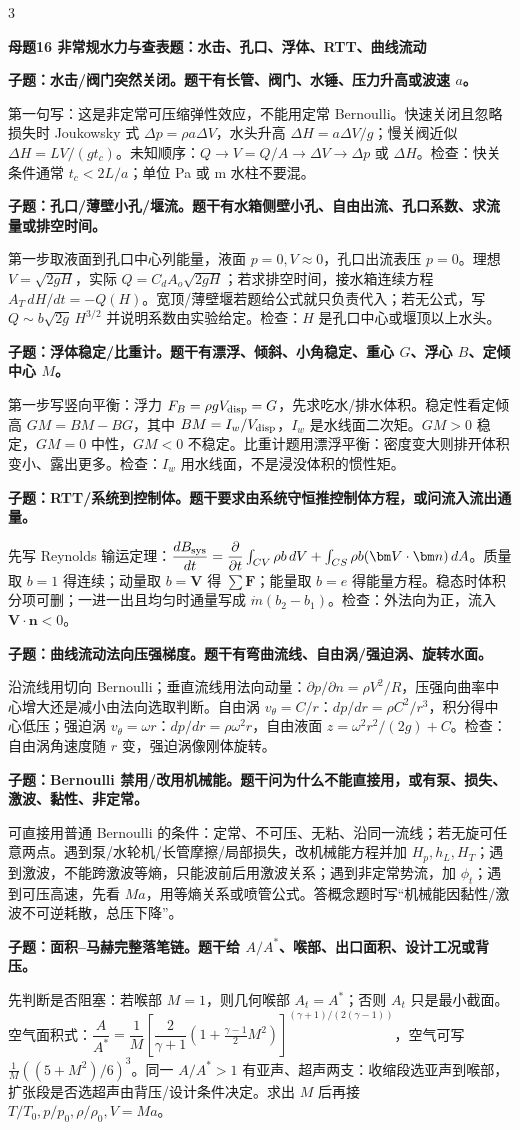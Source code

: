 \documentclass[a4paper]{article}
\newcommand{\mt}[1]{\vspace{0.22pt}\colorbox{M}{\parbox{\dimexpr\linewidth-2\fboxsep}{\color{white}\bfseries #1}}\par}
\newcommand{\qt}[1]{\vspace{0.10pt}\colorbox{Q}{\parbox{\dimexpr\linewidth-2\fboxsep}{\color{white}\bfseries #1}}\par}
\newcommand{\ans}[1]{\colorbox{G}{\parbox{\dimexpr\linewidth-2\fboxsep}{#1}}\par}
\begin{document}
\begin{multicols}{3}
\mt{母题16 非常规水力与查表题：水击、孔口、浮体、RTT、曲线流动}
\qt{子题：水击/阀门突然关闭。题干有长管、阀门、水锤、压力升高或波速 $a$。}
\ans{第一句写：这是非定常可压缩弹性效应，不能用定常 Bernoulli。快速关闭且忽略损失时 Joukowsky 式 $\Delta p=\rho a\Delta V$，水头升高 $\Delta H=a\Delta V/g$；慢关阀近似 $\Delta H=LV/(gt_c)$。未知顺序：$Q\to V=Q/A\to\Delta V\to\Delta p$ 或 $\Delta H$。检查：快关条件通常 $t_c<2L/a$；单位 Pa 或 m 水柱不要混。}
\qt{子题：孔口/薄壁小孔/堰流。题干有水箱侧壁小孔、自由出流、孔口系数、求流量或排空时间。}
\ans{第一步取液面到孔口中心列能量，液面 $p=0,V\approx0$，孔口出流表压 $p=0$。理想 $V=\sqrt{2gH}$，实际 $Q=C_dA_o\sqrt{2gH}$；若求排空时间，接水箱连续方程 $A_T\,dH/dt=-Q(H)$。宽顶/薄壁堰若题给公式就只负责代入；若无公式，写 $Q\sim b\sqrt{2g}\,H^{3/2}$ 并说明系数由实验给定。检查：$H$ 是孔口中心或堰顶以上水头。}
\qt{子题：浮体稳定/比重计。题干有漂浮、倾斜、小角稳定、重心 $G$、浮心 $B$、定倾中心 $M$。}
\ans{第一步写竖向平衡：浮力 $F_B=\rho gV_{\rm disp}=G$，先求吃水/排水体积。稳定性看定倾高 $GM=BM-BG$，其中 $BM=I_w/V_{\rm disp}$，$I_w$ 是水线面二次矩。$GM>0$ 稳定，$GM=0$ 中性，$GM<0$ 不稳定。比重计题用漂浮平衡：密度变大则排开体积变小、露出更多。检查：$I_w$ 用水线面，不是浸没体积的惯性矩。}
\qt{子题：RTT/系统到控制体。题干要求由系统守恒推控制体方程，或问流入流出通量。}
\ans{先写 Reynolds 输运定理：$\dfrac{dB_{\rm sys}}{dt}=\dfrac{\partial}{\partial t}\int_{CV}\rho b\,dV+\int_{CS}\rho b(\bm V\cdot\bm n)\,dA$。质量取 $b=1$ 得连续；动量取 $b=\bm V$ 得 $\sum\bm F$；能量取 $b=e$ 得能量方程。稳态时体积分项可删；一进一出且均匀时通量写成 $\dot m(b_2-b_1)$。检查：外法向为正，流入 $\bm V\cdot\bm n<0$。}
\qt{子题：曲线流动法向压强梯度。题干有弯曲流线、自由涡/强迫涡、旋转水面。}
\ans{沿流线用切向 Bernoulli；垂直流线用法向动量：$\partial p/\partial n=\rho V^2/R$，压强向曲率中心增大还是减小由法向选取判断。自由涡 $v_\theta=C/r$：$dp/dr=\rho C^2/r^3$，积分得中心低压；强迫涡 $v_\theta=\omega r$：$dp/dr=\rho\omega^2r$，自由液面 $z=\omega^2r^2/(2g)+C$。检查：自由涡角速度随 $r$ 变，强迫涡像刚体旋转。}
\qt{子题：Bernoulli 禁用/改用机械能。题干问为什么不能直接用，或有泵、损失、激波、黏性、非定常。}
\ans{可直接用普通 Bernoulli 的条件：定常、不可压、无粘、沿同一流线；若无旋可任意两点。遇到泵/水轮机/长管摩擦/局部损失，改机械能方程并加 $H_p,h_L,H_T$；遇到激波，不能跨激波等熵，只能波前后用激波关系；遇到非定常势流，加 $\phi_t$；遇到可压高速，先看 $Ma$，用等熵关系或喷管公式。答概念题时写“机械能因黏性/激波不可逆耗散，总压下降”。}
\qt{子题：面积--马赫完整落笔链。题干给 $A/A^*$、喉部、出口面积、设计工况或背压。}
\ans{先判断是否阻塞：若喉部 $M=1$，则几何喉部 $A_t=A^*$；否则 $A_t$ 只是最小截面。空气面积式：$\dfrac{A}{A^*}=\dfrac1M\left[\dfrac{2}{\gamma+1}(1+\frac{\gamma-1}{2}M^2)\right]^{(\gamma+1)/(2(\gamma-1))}$，空气可写 $\frac1M((5+M^2)/6)^3$。同一 $A/A^*>1$ 有亚声、超声两支：收缩段选亚声到喉部，扩张段是否选超声由背压/设计条件决定。求出 $M$ 后再接 $T/T_0,p/p_0,\rho/\rho_0,V=Ma$。}

\end{multicols}
\end{document}
